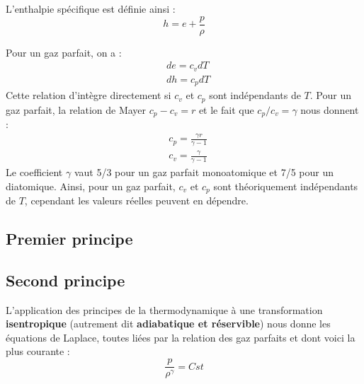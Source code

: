 L'enthalpie spécifique est définie ainsi :
%
\begin{equation}
    h = e + \frac{p}{\rho}
\end{equation}

Pour un gaz parfait, on a :
%
\begin{align}[left=\empheqlbrace]
    & de = c_v dT\\
    & dh = c_p dT
\end{align}
%
Cette relation d'intègre directement si $c_v$ et $c_p$ sont indépendants de $T$. Pour un gaz parfait, la relation de Mayer $c_p - c_v = r$ et le fait que $c_p/c_v = \gamma$ nous donnent :
%
\begin{align}[left=\empheqlbrace]
    & c_p = \frac{\gamma r}{\gamma-1}\\
    & c_v = \frac{\gamma}{\gamma-1}
\end{align}
%
Le coefficient $\gamma$ vaut 5/3 pour un gaz parfait monoatomique et 7/5 pour un diatomique. Ainsi, pour un gaz parfait, $c_v$ et $c_p$ sont théoriquement indépendants de $T$, cependant les valeurs réelles peuvent en dépendre.

\subsection{Premier principe}\label{subsec:1erprincipe}



\subsection{Second principe}



L'application des principes de la thermodynamique à une transformation \textbf{isentropique} (autrement dit \textbf{adiabatique et réservible}) nous donne les équations de Laplace, toutes liées par la relation des gaz parfaits et dont voici la plus courante :
%
\begin{equation}
    \frac{p}{\rho^{\gamma}} = Cst
\end{equation}
